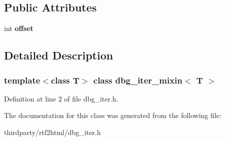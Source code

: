 \subsection*{Public Attributes}
\begin{DoxyCompactItemize}
\item 
\mbox{\label{classdbg__iter__mixin_a5fb3d2ef4853e4e16af2828043e78d4c}} 
int {\bfseries offset}
\end{DoxyCompactItemize}


\subsection{Detailed Description}
\subsubsection*{template$<$class T$>$\newline
class dbg\+\_\+iter\+\_\+mixin$<$ T $>$}



Definition at line 2 of file dbg\+\_\+iter.\+h.



The documentation for this class was generated from the following file\+:\begin{DoxyCompactItemize}
\item 
thirdparty/rtf2html/dbg\+\_\+iter.\+h\end{DoxyCompactItemize}
